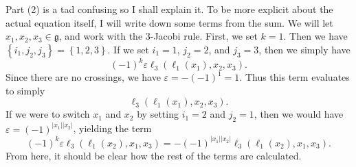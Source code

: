 Part (2) is a tad confusing so I shall explain it. To be more explicit about the actual equation itself, I will write down some terms from the sum. We will let $x_1,x_2,x_3\in \mathfrak{g} $, and work with the 3-Jacobi rule. First, we set $k=1$. Then we have $\left\{ i_1, j_2, j_3 \right\} =\left\{ 1,2,3 \right\} $. If we set $i_1=1$, $j_2=2$, and $j_3=3$, then we simply have
\[
	(-1)^k \varepsilon \ell_3(\ell _1(x_1),x_2,x_3)
.\]
Since there are no crossings, we have $\varepsilon =-(-1)^1 = 1$. Thus this term evaluates to simply
\[
	\ell _3(\ell _1(x_1),x_2,x_3)
.\]
If we were to switch $x_1$ and $x_2$ by setting $i_1 = 2$ and $j_2 = 1$, then we would have $\varepsilon =(-1)^{\left| x_1 \right| \left| x_2 \right|}$, yielding the term
\[
	(-1)^k {\varepsilon } \ell _3(\ell _1(x_2),x_1,x_3) = -(-1)^{\left| x_1 \right| \left| x_2 \right| } \ell _3(\ell _1(x_2),x_1,x_3)
.\]
From here, it should be clear how the rest of the terms are calculated.

